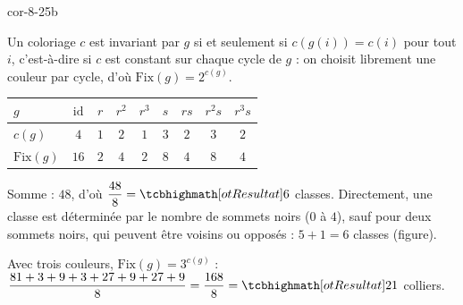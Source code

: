 \begin{blocLivre}{cor-8-25b}
\begin{corrigeSuite}
\begin{questions}[start=7]
  \item Un coloriage $c$ est invariant par $g$ si et seulement si
    $c(g(i))=c(i)$ pour tout $i$, c'est-à-dire si $c$ est constant sur
    chaque cycle de $g$ : on choisit librement une couleur par cycle,
    d'où $\mathrm{Fix}(g)=2^{c(g)}$.
    \begin{center}
    \begin{tabular}{@{}lcccccccc@{}}
      $g$ & $\mathrm{id}$ & $r$ & $r^{2}$ & $r^{3}$ & $s$ & $rs$ & $r^{2}s$ & $r^{3}s$\\\hline
      $c(g)$ & $4$ & $1$ & $2$ & $1$ & $3$ & $2$ & $3$ & $2$\\
      $\mathrm{Fix}(g)$ & $16$ & $2$ & $4$ & $2$ & $8$ & $4$ & $8$ & $4$
    \end{tabular}
    \end{center}
  \item Somme : $48$, d'où $\dfrac{48}{8}=\res{6}$ classes. Directement,
    une classe est déterminée par le nombre de sommets noirs ($0$ à $4$),
    sauf pour deux sommets noirs, qui peuvent être voisins ou opposés :
    $5+1=6$ classes (figure).
  \item Avec trois couleurs, $\mathrm{Fix}(g)=3^{c(g)}$ :
    $\dfrac{81+3+9+3+27+9+27+9}{8}=\dfrac{168}{8}=\res{21}$ colliers.
\end{questions}
\begin{center}
\\[0.5mm]
\end{center}
\end{corrigeSuite}
\end{blocLivre}
